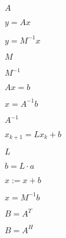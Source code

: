 \documentclass{article}
\begin{document}
$A$
\pagebreak

$y = Ax$
\pagebreak

$y = M^{-1}x$
\pagebreak

$M$
\pagebreak

$M^{-1}$
\pagebreak

$Ax = b$
\pagebreak

$x = A^{-1}b$
\pagebreak

$A^{-1}$
\pagebreak

$x_{k+1} = Lx_k + b$
\pagebreak

$L$
\pagebreak

$b = L \cdot a$
\pagebreak

$x:=x+b$
\pagebreak

$x = M^{-1}b$
\pagebreak

$B = A^{T}$
\pagebreak

$B = A^{H}$
\pagebreak
\end{document}
